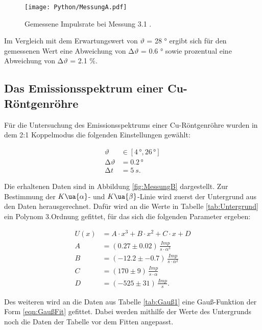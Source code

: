 \begin{figure}
  \centering
  \texttt{[image: Python/MessungA.pdf]}
  \caption{Gemessene Impulsrate bei Messung 3.1 .}
  \label{fig:MessungA}
\end{figure}

Im Vergleich mit dem Erwartungswert von $\vartheta$ = 28 ° ergibt sich für den
gemessenen Wert eine
Abweichung von $\increment\vartheta$ = 0.6 ° sowie prozentual eine Abweichung
von $\increment\vartheta$ = 2.1 $\%$.



\subsection{Das Emissionsspektrum einer Cu-Röntgenröhre}

Für die Untersuchung des Emissionsspektrums einer Cu-Röntgenröhre wurden in dem
2:1 Koppelmodus die folgenden Einstellungen gewählt:

\begin{align*}
  \vartheta        &\in [4 \,°, 26\, °]  \\
  \increment\vartheta &= 0.2 \,° \\
  \increment t     &= \SI{5}{s} .
\end{align*}

Die erhaltenen Daten sind in Abbildung \ref{fig:MessungB} dargestellt. Zur Bestimmung der
$K\ua{\alpha}$- und $K\ua{\beta}$-Linie wird zuerst der Untergrund aus den Daten
herausgerechnet. Dafür wird an die Werte in Tabelle \ref{tab:Untergrund} ein Polynom 3.Ordnung
gefittet, für das sich die folgenden Parameter ergeben:

\begin{align*}
  U(x) &= A\cdot x^3 + B\cdot x^2 + C\cdot x + D \\
  A &=  (0.27 \pm 0.02) \, \si{\frac{Imp}{s\cdot \alpha^3}} \\
  B &= (-12.2 \pm -0.7) \, \si{\frac{Imp}{s\cdot \alpha^2}} \\
  C &= (170 \pm 9) \, \si{\frac{Imp}{s\cdot \alpha}} \\
  D &= (-525 \pm 31) \, \si{\frac{Imp}{s}} .
\end{align*}

Des weiteren wird an die Daten aus Tabelle \ref{tab:Gauß1} eine Gauß-Funktion
der Form \eqref{eqn:GaußFit} gefittet. Dabei werden mithilfe der
Werte des Untergrunds noch die Daten der Tabelle vor dem Fitten angepasst.

